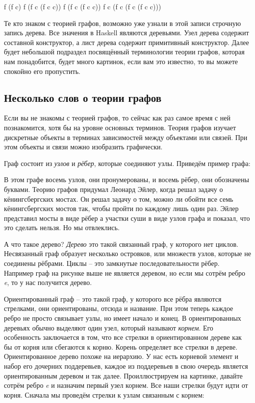 \begin{code}
f (f c)
f (f c (f c c))
f (f c (f c c))
f c (f c (f c (f c c)))
\end{code}

Те кто знаком с теорией графов, возможно уже узнали в 
этой записи строчную запись дерева. Все значения в Haskell
являются деревьями. Узел дерева содержит составной конструктор, 
а лист дерева содержит примитивный конструктор. 
Далее будет небольшой подраздел посвящённый терминологии теории
графов, которая нам понадобится, будет много картинок, 
если вам это известно, то вы можете спокойно его пропустить.

\subsection{Несколько слов о теории графов}

Если вы не знакомы с теорией графов, то сейчас как раз 
самое время с ней познакомится, хотя бы на  уровне основных 
терминов. Теория графов изучает дискретные объекты в терминах
зависимостей между объектами или связей. При этом объекты и 
связи можно изобразить графически. 

Граф состоит из \emph{узлов} и \emph{рёбер}, которые соединяют
узлы. Приведём пример графа:


В этом графе восемь узлов, они пронумерованы, и восемь рёбер, они обозначены
буквами. Теорию графов придумал Леонард Эйлер, когда решал задачу
о кёнингсбергских мостах. Он решал задачу о том, можно ли обойти 
все семь кёнингсбергских мостов так, чтобы пройти по каждому лишь 
один раз. Эйлер представил мосты в виде рёбер а участки суши в виде
узлов графа и показал, что это сделать нельзя. Но мы отвлеклись. 

А что такое дерево? 
\emph{Дерево} это такой связанный граф, у которого нет циклов. 
Несвязанный граф образует несколько островков, или множеств 
узлов, которые не соединены рёбрами. Циклы -- это
замкнутые последовательности рёбер. Например граф на рисунке
выше не является деревом, но если мы сотрём ребро \emph{e}, то у
нас получится дерево.

Ориентированный граф -- это такой граф, у которого все рёбра 
являются стрелками, они ориентированы, отсюда и название. 
При этом теперь каждое ребро не просто связывает узлы, но
имеет начало и конец. В ориентированных деревьях обычно выделяют
один узел, который называют \emph{корнем}. Его особенность заключается
в том, что все стрелки в ориентированном дереве как бы 
от корня или сбегаются к корню. Корень определяет 
все стрелки в дереве. Ориентированное дерево похоже на иерархию.
У нас есть корневой элемент и набор его дочерних поддеревьев,
каждое из поддеревьев в свою очередь является ориентированным
деревом и так далее. Проиллюстрируем на картинке, давайте 
сотрём ребро \emph{e} и назначим первый узел корнем. 
Все наши стрелки будут идти от корня. Сначала мы
проведём стрелки к узлам связанным с корнем:

